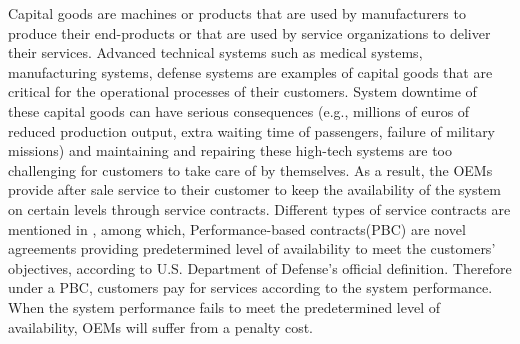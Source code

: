 \documentclass[preprint,12pt]{elsarticle}
\begin{document}
Capital goods are machines or products that are used by manufacturers to produce their end-products or that are used by service organizations to deliver their services. Advanced technical systems such as medical systems, manufacturing systems, defense systems are examples of capital goods that are critical for the operational processes of their customers. System downtime of these capital goods can have serious consequences (e.g., millions of euros of reduced production output, extra waiting time of passengers, failure of military missions) and maintaining and repairing these high-tech systems are too challenging for customers to take care of by themselves. As a result, the OEMs provide after sale service to their customer to keep the availability of the system on certain levels through service contracts. Different types of service contracts are mentioned in \citet{Cohen2006}, among which, Performance-based contracts(PBC) are novel agreements providing predetermined level of availability to meet the customers' objectives, according to U.S. Department of Defense's official definition. Therefore under a PBC, customers pay for services according to the system performance. When the system performance fails to meet the predetermined level of availability, OEMs will suffer from a penalty cost.


\end{document}
